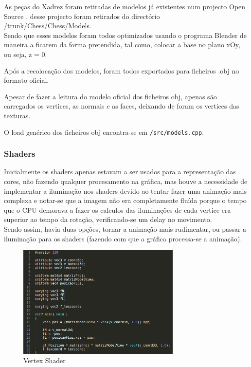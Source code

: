 \documentclass[portugues,final]{revdetua}
\begin{document}
As peças do Xadrez foram retiradas de modelos já existentes num projecto Open Source \cite{pwag}, desse projecto foram retirados do directório /trunk/Chess/Chess/Models.\\

Sendo que esses modelos foram todos optimizados usando o programa Blender de maneira a ficarem da forma pretendida, tal como, colocar a base no plano xOy, ou seja, z = 0.

Após a recolocação dos modelos, foram todos exportados para ficheiros .obj no formato oficial.

Apesar de fazer a leitura do modelo oficial dos ficheiros obj, apenas são carregados os vertices, as normais e as faces, deixando de foram os vertices das texturas.

O load genérico dos ficheiros obj encontra-se em {\tt /src/models.cpp}.

\subsubsection{Shaders}

Inicialmente os shaders apenas estavam a ser usados para a representação das cores, não fazendo qualquer procesamento na gráfica, mas houve a necessidade de implementar a iluminação nos shaders devido ao tentar fazer uma animação mais complexa e notar-se que a imagem não era completamente fluída porque o tempo que o CPU demorava a fazer os calculos das iluminações de cada vertice era superior ao tempo da rotação, verificando-se um delay no movimento.\\

Sendo assim, havia duas opções, tornar a animação mais rudimentar, ou passar a iluminação para os shaders (fazendo com que a gráfica processa-se a animação).

\begin{figure}[H]
\centerline{\includegraphics[width=230pt]{images/vertexshader.png}}
\caption{Vertex Shader}
\label{img:complete}
\end{figure}
\end{document}
